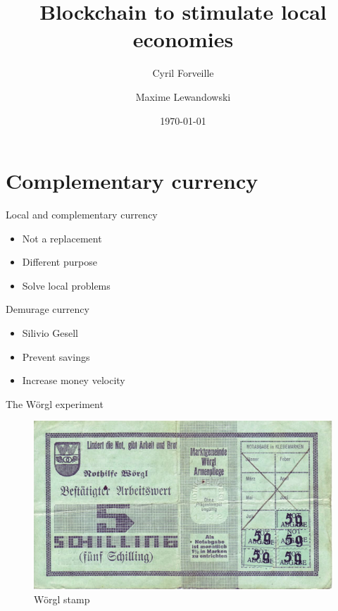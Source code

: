 \documentclass[12pt]{beamer}
\title{Blockchain to stimulate local economies}
\date{\today}
\author{Cyril Forveille \and Maxime Lewandowski}
\begin{document}
  \maketitle



  \section{Complementary currency}

  \begin{frame}{Local and complementary currency}
    \begin{itemize}
      \item Not a replacement
      \item Different purpose
      \item Solve \alert{local} problems
    \end{itemize}
  \end{frame}

  \begin{frame}{Demurage currency}
    \begin{itemize}
      \item Silivio Gesell
      \item Prevent savings
      \item Increase money velocity
    \end{itemize}
  \end{frame}

  \begin{frame}{The Wörgl experiment}
    \begin{figure}
      \includegraphics[height=.5\textheight]{images/worgl-5}
      \caption{Wörgl stamp}
    \end{figure}
  \end{frame}
\end{document}

